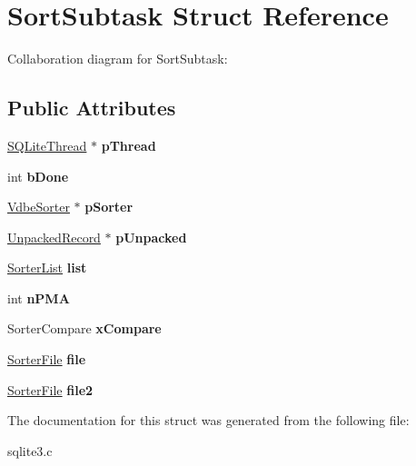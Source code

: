 \hypertarget{structSortSubtask}{}\section{Sort\+Subtask Struct Reference}
\label{structSortSubtask}


Collaboration diagram for Sort\+Subtask\+:
\subsection*{Public Attributes}
\begin{DoxyCompactItemize}
\item 
\hyperlink{structSQLiteThread}{S\+Q\+Lite\+Thread} $\ast$ {\bfseries p\+Thread}\hypertarget{structSortSubtask_abb534010ac35e0c37e41c26712e7b58c}{}\label{structSortSubtask_abb534010ac35e0c37e41c26712e7b58c}

\item 
int {\bfseries b\+Done}\hypertarget{structSortSubtask_a156fc75053f13e877c36d80885338060}{}\label{structSortSubtask_a156fc75053f13e877c36d80885338060}

\item 
\hyperlink{structVdbeSorter}{Vdbe\+Sorter} $\ast$ {\bfseries p\+Sorter}\hypertarget{structSortSubtask_a2a8ec6b4b0d29090e3b33b1a6647655a}{}\label{structSortSubtask_a2a8ec6b4b0d29090e3b33b1a6647655a}

\item 
\hyperlink{structUnpackedRecord}{Unpacked\+Record} $\ast$ {\bfseries p\+Unpacked}\hypertarget{structSortSubtask_af2312bacbb7e4cbe905eae20a60a3f39}{}\label{structSortSubtask_af2312bacbb7e4cbe905eae20a60a3f39}

\item 
\hyperlink{structSorterList}{Sorter\+List} {\bfseries list}\hypertarget{structSortSubtask_a0a79fd21798a08ceede3febbd08c88a2}{}\label{structSortSubtask_a0a79fd21798a08ceede3febbd08c88a2}

\item 
int {\bfseries n\+P\+MA}\hypertarget{structSortSubtask_a6ecceaeda562346b298aa9fb95355071}{}\label{structSortSubtask_a6ecceaeda562346b298aa9fb95355071}

\item 
Sorter\+Compare {\bfseries x\+Compare}\hypertarget{structSortSubtask_a42bfd224f9e8125c22c2cc66f865d9af}{}\label{structSortSubtask_a42bfd224f9e8125c22c2cc66f865d9af}

\item 
\hyperlink{structSorterFile}{Sorter\+File} {\bfseries file}\hypertarget{structSortSubtask_a077f999ff1e4148e48bd8df25092fd85}{}\label{structSortSubtask_a077f999ff1e4148e48bd8df25092fd85}

\item 
\hyperlink{structSorterFile}{Sorter\+File} {\bfseries file2}\hypertarget{structSortSubtask_a23b46687f7a96ef1052a062f8097234e}{}\label{structSortSubtask_a23b46687f7a96ef1052a062f8097234e}

\end{DoxyCompactItemize}


The documentation for this struct was generated from the following file\+:\begin{DoxyCompactItemize}
\item 
sqlite3.\+c\end{DoxyCompactItemize}
